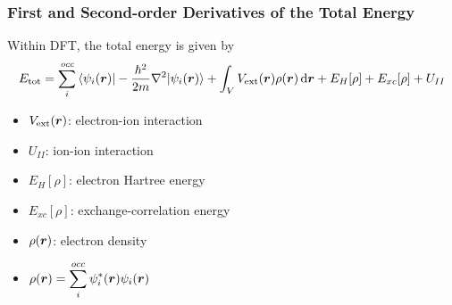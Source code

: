 \begin{frame}
  \frametitle{First and Second-order Derivatives of the Total Energy}
  Within DFT, the total energy is given by
  \begin{equation*}
    E_{\text{tot}} =
    \sum_{i}^{\textit{occ}}
    \braket{
      \psi_i(\boldr)
      |-{\hbar^2\over2m}\nabla^2 |
      \psi_i(\boldr)
    }
    +
    \int_{\tikzmark{int_space}V} V_{\text{ext}}(\boldr) \rho(\boldr) \,\mathrm{d}\boldr
    +
    E_H[\rho]
    +
    E_{xc}[\rho]
    +
    U_{II}
  \end{equation*}


  \begin{multicols}{2}
    \begin{itemize}
      \item $V_{\text{ext}}(\boldsymbol{r})$: electron-ion interaction
      \item $U_{II}$: ion-ion interaction
      \item $E_H[\rho]$: electron Hartree energy
      \item $E_{xc}[\rho]$: exchange-correlation energy
      \item $\rho(\boldsymbol{r})$: electron density
      \item[] $\displaystyle \rho(\boldsymbol{r}) = \sum_i^{occ} \psi_i^*(\boldsymbol{r}) \psi_i(\boldsymbol{r})$
    \end{itemize}
  \end{multicols}


\end{frame}
